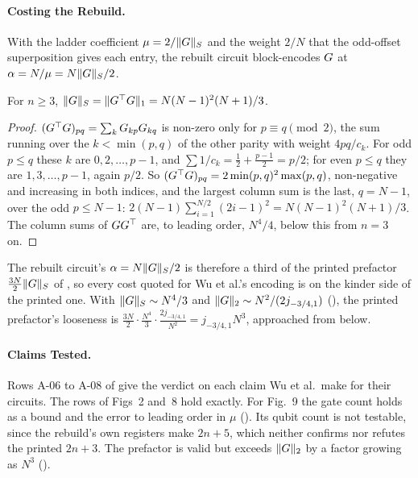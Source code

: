 \paragraph{Costing the Rebuild.} With the ladder coefficient $\mu=2/\|G\|_S$ and the weight $2/N$ that the odd-offset superposition gives each entry, the rebuilt circuit block-encodes $\G$ at $\alpha=N/\mu=N\|G\|_S/2$.

\begin{lemma}[Wu et al.'s norm of $\G$]
\label{lem:G-paper-norm}
For $n\ge3$, $\|G\|_S=\|G^{\top}G\|_1=N(N-1)^2(N+1)/3$.
\end{lemma}
\begin{proof}
$(G^{\top}G)_{pq}=\sum_kG_{kp}G_{kq}$ is non-zero only for $p\equiv q\pmod 2$, the sum running over the $k<\min(p,q)$ of the other parity with weight $4pq/c_k$. For odd $p\le q$ these $k$ are $0,2,\dots,p-1$, and $\sum1/c_k=\tfrac12+\tfrac{p-1}{2}=p/2$; for even $p\le q$ they are $1,3,\dots,p-1$, again $p/2$. So $(G^{\top}G)_{pq}=2\min(p,q)^2\max(p,q)$, non-negative and increasing in both indices, and the largest column sum is the last, $q=N-1$, over the odd $p\le N-1$: $2(N-1)\sum_{i=1}^{N/2}(2i-1)^2=N(N-1)^2(N+1)/3$. The column sums of $GG^{\top}$ are, to leading order, $N^4/4$, below this from $n=3$ on.
\end{proof}

The rebuilt circuit's $\alpha=N\|G\|_S/2$ is therefore a third of the printed prefactor $\tfrac{3N}{2}\|G\|_S$ of , so every cost quoted for Wu et al.'s encoding is on the kinder side of the printed one. With $\|G\|_S\sim N^4/3$ and $\|G\|_2\sim N^2/(2j_{-3/4,1})$ (), the printed prefactor's looseness is $\tfrac{3N}{2}\cdot\tfrac{N^4}{3}\cdot\tfrac{2j_{-3/4,1}}{N^2}=j_{-3/4,1}N^3$, approached from below.

\paragraph{Claims Tested.} Rows A-06 to A-08 of  give the verdict on each claim Wu et al.\ make for their circuits. The rows of Figs~2 and~8 hold exactly. For Fig.~9 the gate count holds as a bound and the error to leading order in $\mu$ (). Its qubit count is not testable, since the rebuild's own registers make $2n+5$, which neither confirms nor refutes the printed $2n+3$. The prefactor is valid but exceeds $\|G\|_2$ by a factor growing as $N^3$ ().

